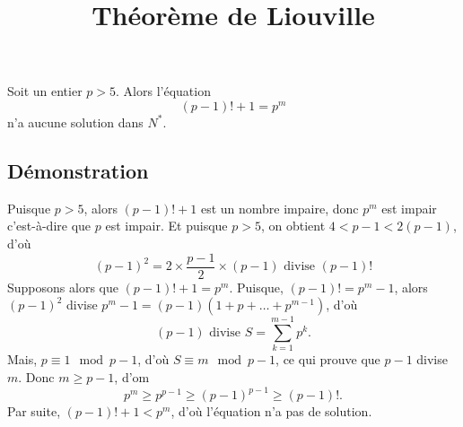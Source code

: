 \documentclass[fontsize=12pt,twoside=false,parskip=half, french]{scrartcl}
\title{Théorème de Liouville}
\date{}
\author{}
\begin{document}
\maketitle
   \begin{Theoreme}
      Soit un entier $p > 5$. Alors l’équation
      \[
         (p - 1)! + 1 = p^m
      \]
      n’a aucune solution dans $N^*$.
   \end{Theoreme}
   \subsection{Démonstration}
      Puisque $p > 5$, alors $(p - 1)! + 1$ est un nombre impaire, donc $p^m$ est impair c’est-à-dire 
      que $p$ est impair. Et puisque $p > 5$, on obtient $4 < p - 1 < 2(p - 1)$, d’où
      \[
         (p - 1)^2 = 2 \times \frac{p - 1}{2} \times (p - 1) \text{ divise } (p - 1)!
      \]
      Supposons alors que $(p - 1)! + 1 = p^m$. Puisque, $(p - 1)! = p^m - 1$,
      alors $(p - 1)^2$ divise $p^m - 1 = (p - 1)(1 + p + \ldots + p^{m - 1})$, d’où
      \[
         (p - 1) \text{ divise } S = \sum_{k = 1}^{m - 1} p^k. 
      \]
      Mais, $p \equiv 1 \mod p - 1$, d’où $S \equiv m \mod p - 1$, ce qui prouve que
     $p - 1$ divise $m$. Donc $m \geq p - 1$, d’om
     \[
      p^m \geq p^{p - 1} \geq (p - 1)^{p - 1} \geq (p - 1)!.
     \]
     Par suite, $(p - 1)! + 1 < p^m$, d’où l’équation n’a pas de solution.
\end{document}
